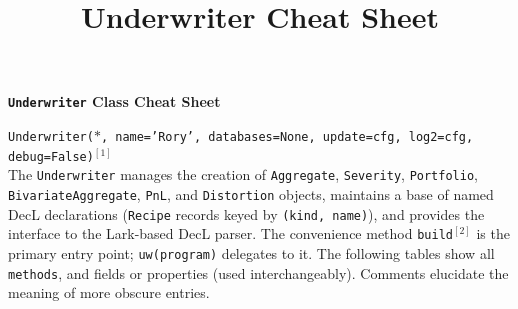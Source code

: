 %
%
%


\title{Underwriter Cheat Sheet}




{\huge{\bf \textbf{\texttt{Underwriter} Class Cheat Sheet}}}

\raggedright
\texttt{\m Underwriter($*$, name='Rory', databases=None, update=cfg, log2=cfg, debug=False)}${}^{[1]}$ \\

The \texttt{Underwriter} manages the creation of \texttt{Aggregate}, \texttt{Severity}, \texttt{Portfolio}, \texttt{BivariateAggregate}, \texttt{PnL}, and \texttt{Distortion} objects, maintains a base of named DecL declarations (\texttt{Recipe} records keyed by \texttt{(kind, name)}), and provides the interface to the Lark-based DecL parser. The convenience method \texttt{\m build}${}^{[2]}$ is the primary entry point; \texttt{uw(program)} delegates to it.
The following tables show all \texttt{\m methods}, and fields or properties (used interchangeably). Comments elucidate the meaning of more obscure entries.


